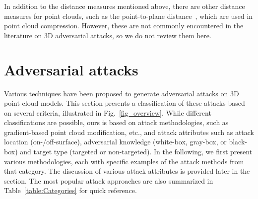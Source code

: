 \documentclass{ieeeaccess}
\begin{document}
In addition to the distance measures mentioned above, there are other distance measures for point clouds, such as the point-to-plane distance~\cite{PC_distortion_ICIP2017}, which are used in point cloud compression. However, these are not commonly encountered in the literature on 3D adversarial attacks, so we do not review them here. 


\section{Adversarial attacks}
\label{sec:Adversarial attacks}


Various techniques have been proposed to generate adversarial attacks on 3D point cloud models. This section presents a classification of these attacks based on several criteria, illustrated in Fig.~\ref{fig_overview}. While different classifications are possible, ours is based on attack methodologies, such as gradient-based point cloud modification, etc., and attack attributes such as attack location (on-/off-surface), adversarial knowledge (white-box, gray-box, or black-box) and target type (targeted or non-targeted). %
In the following, we first present various methodologies, each with specific examples of the attack methods from that category. The discussion of various attack attributes is provided later in the section.
The most popular attack approaches are also summarized in Table~\ref{table:Categories} for quick reference. %
\end{document}
